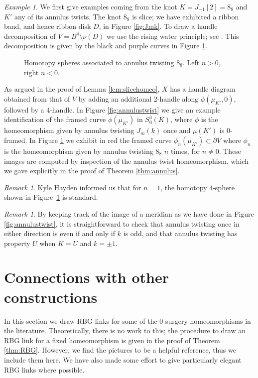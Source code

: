 \documentclass [11pt]{amsart}
\theoremstyle{remark}
\newtheorem {remark}[theorem]{Remark}
\newtheorem {example}[theorem]{Example}
\begin{document}
\begin{example}\label{ex:htpy88}
We first give examples coming from the knot $K=J_{-1}[2]=8_8$ and $K'$ any of its annulus twists. The knot $8_8$ is slice; we have exhibited a ribbon band, and hence ribbon disk $D$, in Figure \ref{fig:Jmk}. To draw a handle decomposition of $V=B^4\setminus\nu(D)$ we use the rising water principle; see \cite[Chapter 6.2]{GS}. This decomposition is given by the black and purple curves in Figure \ref{fig:htpy88}. 

\begin{figure}
{
   \fontsize{10pt}{12pt}\selectfont
   \def\svgwidth{5in}
   
}
\caption{Homotopy spheres associated to annulus twisting $8_8$. Left $n>0$, right $n<0$.}
\label{fig:htpy88}
\end{figure}


As argued in the proof of Lemma \ref{lem:slicehomeo}, $X$ has a handle diagram obtained from that of $V$ by adding an additional 2-handle along $\phi(\mu_{K'}, 0)$, followed by a 4-handle. In Figure \ref{fig:annulustwist} we give an example identification of the framed curve $\phi(\mu_{K'})$ in $S^3_0(K)$, where $\phi$ is the homeomorphism given by annulus twisting $J_m(k)$ once and $\mu(K')$ is 0-framed. In Figure \ref{fig:htpy88} we exhibit in red the framed curve $\phi_n(\mu_{K'})\subset \partial V$ where $\phi_n$ is the homeomorphism given by annulus twisting $8_8$ $n$ times, for $n\neq 0$. These images are computed by inspection of the annulus twist homeomorphism, which we gave explicitly in the proof of Theorem \ref{thm:annulus}. 
\end{example}

\begin{remark}
Kyle Hayden informed us that for $n=1$, the homotopy $4$-sphere shown in Figure~\ref{fig:htpy88} is standard. 
\end{remark}

\begin{remark}\label{rem:annulusparity}
By keeping track of the image of a meridian as we have done in Figure \ref{fig:annulustwist}, it is straightforward to check that annulus twisting once in either direction is even if and only if $k$ is odd, and that annulus twisting has property $U$ when $K=U$ and $k=\pm 1$. 
\end{remark}



\section{Connections with other constructions}\label{sec:otherconstr}
In this section we draw RBG links for some of the 
0-surgery homeomorphisms in the literature. Theoretically, there is no work to this; the procedure to draw an RBG link for a fixed homeomorphism is given in the proof of Theorem \ref{thm:RBG}. However, we find the pictures to be a helpful reference, thus we include them here. We have also made some effort to give particularly elegant RBG links where possible. 
\end{document}
